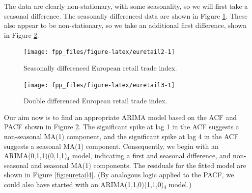 \documentclass[]{book}
\newenvironment{Shaded}{\begin{snugshade}}{\end{snugshade}}
\newcommand{\DataTypeTok}[1]{\textcolor[rgb]{0.13,0.29,0.53}{#1}}
\newcommand{\DecValTok}[1]{\textcolor[rgb]{0.00,0.00,0.81}{#1}}
\newcommand{\KeywordTok}[1]{\textcolor[rgb]{0.13,0.29,0.53}{\textbf{#1}}}
\newcommand{\NormalTok}[1]{#1}
\newcommand{\OperatorTok}[1]{\textcolor[rgb]{0.81,0.36,0.00}{\textbf{#1}}}
\newcommand{\StringTok}[1]{\textcolor[rgb]{0.31,0.60,0.02}{#1}}
\begin{document}
The data are clearly non-stationary, with some seasonality, so we will first take a seasonal difference. The seasonally differenced data are shown in Figure \ref{fig:euretail2}. These also appear to be non-stationary, so we take an additional first difference, shown in Figure \ref{fig:euretail3}.

\begin{Shaded}
\end{Shaded}

\begin{figure}

{\centering \texttt{[image: fpp\_files/figure-latex/euretail2-1]} 

}

\caption{Seasonally differenced European retail trade index.}\label{fig:euretail2}
\end{figure}

\begin{Shaded}
\end{Shaded}

\begin{figure}

{\centering \texttt{[image: fpp\_files/figure-latex/euretail3-1]} 

}

\caption{Double differenced European retail trade index.}\label{fig:euretail3}
\end{figure}

Our aim now is to find an appropriate ARIMA model based on the ACF and PACF shown in Figure \ref{fig:euretail3}. The significant spike at lag 1 in the ACF suggests a non-seasonal MA(1) component, and the significant spike at lag 4 in the ACF suggests a seasonal MA(1) component. Consequently, we begin with an ARIMA(0,1,1)(0,1,1)\(_4\) model, indicating a first and seasonal difference, and non-seasonal and seasonal MA(1) components. The residuals for the fitted model are shown in Figure \ref{fig:euretail4}. (By analogous logic applied to the PACF, we could also have started with an ARIMA(1,1,0)(1,1,0)\(_4\) model.)
\end{document}
